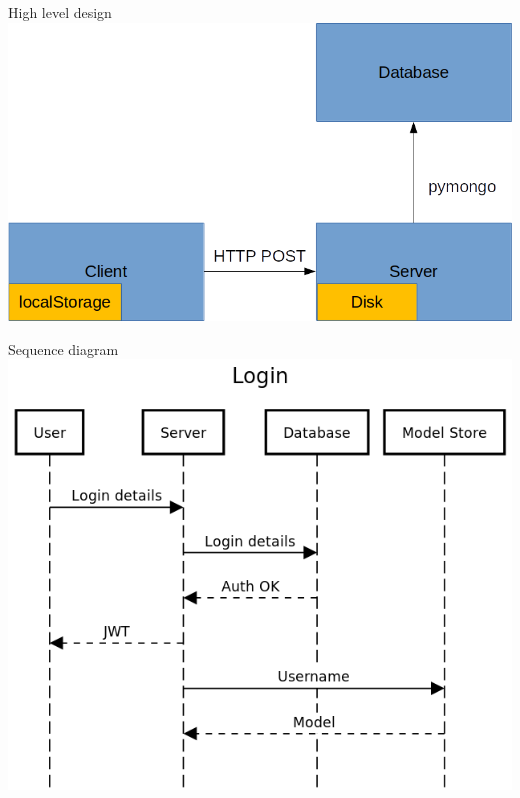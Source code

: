 \documentclass{beamer}
\begin{document}
\begin{frame}{High level design}
\includegraphics[scale=0.5]{high_level.png}
\end{frame}

\begin{frame}{Sequence diagram}
\includegraphics[scale=0.4]{Login.png}
\end{frame}
\end{document}
